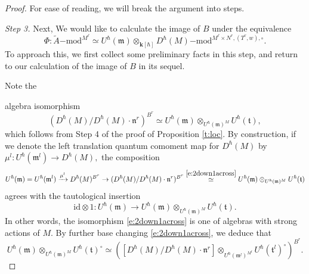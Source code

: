 \documentclass{amsart}
\theoremstyle{definition}
\newcommand{\fm}{\mathfrak{m}}
\newcommand{\lmod}{\on{-mod}}
\newcommand{\ft}{\mathfrak{t}}
\newcommand{\on}{\mathrm}
\newcommand{\bk}{\mathbf{k}}
\numberwithin{equation}{section}
\begin{document}
{\begin{proof} { For ease of reading, we will break the argument into steps. }
{ {\em Step 3.} Next, We would like to calculate the image of $B$ under the equivalence 
$$\Phi: \tilde{A}\lmod^{M^\ell} \simeq U^\hbar(\fm)  \otimes_{\bk[\hbar]} D^\hbar(M)\lmod^{M^\ell \times N^r, (T^r, w), \circ}.$$
To approach this, we first collect some preliminary facts in this step, and return to our calculation of the image of $B$ in its sequel. 

Note the {  algebra isomorphism \begin{equation} \label{e:2down1across}(D^\hbar(M)/D^\hbar(M) \cdot \mathfrak{n}^r)^{B^r} \simeq  U^{\hbar}(\fm) \otimes_{{U^\hbar(\fm)^M}} U^\hbar(\ft),\end{equation} which follows from Step 4 of the proof of Proposition \ref{t:loc}. By construction, if we denote the left translation quantum comoment map for $D^\hbar(M)$ by $\mu^l: U^\hbar(\fm^l) \rightarrow D^\hbar(M),$ the composition 
\begin{equation} \label{e:comoment1} U^\hbar(\fm) = U^\hbar(\fm^l) \xrightarrow{\mu^l} D^\hbar(M)^{B^r} \rightarrow (D^\hbar(M)/D^\hbar(M) \cdot \mathfrak{n}^r)^{B^r} \overset{\eqref{e:2down1across}}{\simeq}  U^{\hbar}(\fm)  \otimes_{{U^\hbar(\fm)^M}} U^\hbar(\ft)\end{equation}agrees with the tautological insertion 
\begin{equation} \label{e:comoment2} \on{id} \otimes 1: U^\hbar(\fm) \rightarrow  U^{\hbar}(\fm)  \otimes_{{U^\hbar(\fm)^M}} U^\hbar(\ft) .\end{equation}In other words, the isomorphism \eqref{e:2down1across} is one of algebras with strong actions of $M$. By further base changing \eqref{e:2down1across}, we   deduce that \begin{equation} \label{e:basechange2down} U^{\hbar}(\fm) \otimes_{{U^\hbar(\fm)^M}} U^\hbar(\ft)^\circ \simeq \left([D^\hbar(M)/D^\hbar(M) \cdot \mathfrak{n}^r]  \otimes_{{U^\hbar(\fm^l)^{M^l}}} U^\hbar(\ft^l)^\circ\right)^{B^r}.\end{equation}

}}
\end{proof}}
\end{document}
